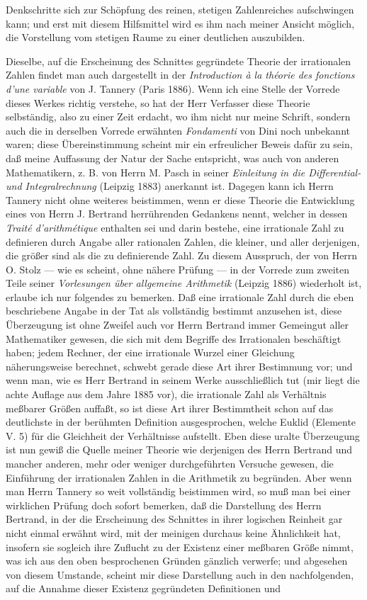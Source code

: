 \documentclass[11pt]{article}
\begin{document}
Denkschritte sich zur Schöpfung des reinen, stetigen Zahlenreiches aufschwingen kann; und erst mit diesem Hilfsmittel wird es ihm nach meiner Ansicht möglich, die Vorstellung vom stetigen Raume zu einer deutlichen auszubilden.

Dieselbe, auf die Erscheinung des Schnittes gegründete Theorie der irrationalen Zahlen findet man auch dargestellt in der \emph{Introduction à la théorie des fonctions d'une variable} von J. Tannery (Paris 1886). Wenn ich eine Stelle der Vorrede dieses Werkes richtig verstehe, so hat der Herr Verfasser diese Theorie selbständig, also zu einer Zeit erdacht, wo ihm nicht nur meine Schrift, sondern auch die in derselben Vorrede erwähnten \emph{Fondamenti} von Dini noch unbekannt waren; diese Übereinstimmung scheint mir ein erfreulicher Beweis dafür zu sein, daß meine Auffassung der Natur der Sache entspricht, was auch von anderen Mathematikern, z. B. von Herrn M. Pasch in seiner \emph{Einleitung in die Differential- und Integralrechnung} (Leipzig 1883) anerkannt ist. Dagegen kann ich Herrn Tannery nicht ohne weiteres beistimmen, wenn er diese Theorie die Entwicklung eines von Herrn J. Bertrand herrührenden Gedankens nennt, welcher in dessen \emph{Traité d'arithmétique} enthalten sei und darin bestehe, eine irrationale Zahl zu definieren durch Angabe aller rationalen Zahlen, die kleiner, und aller derjenigen, die größer sind als die zu definierende Zahl. Zu diesem Ausspruch, der von Herrn O. Stolz — wie es scheint, ohne nähere Prüfung — in der Vorrede zum zweiten Teile seiner \emph{Vorlesungen über allgemeine Arithmetik} (Leipzig 1886) wiederholt ist, erlaube ich nur folgendes zu bemerken. Daß eine irrationale Zahl durch die eben beschriebene Angabe in der Tat als vollständig bestimmt anzusehen ist, diese Überzeugung ist ohne Zweifel auch vor Herrn Bertrand immer Gemeingut aller Mathematiker gewesen, die sich mit dem Begriffe des Irrationalen beschäftigt haben; jedem Rechner, der eine irrationale Wurzel einer Gleichung näherungsweise berechnet, schwebt gerade diese Art ihrer Bestimmung vor; und wenn man, wie es Herr Bertrand in seinem Werke ausschließlich tut (mir liegt die achte Auflage aus dem Jahre 1885 vor), die irrationale Zahl als Verhältnis meßbarer Größen auffaßt, so ist diese Art ihrer Bestimmtheit schon auf das deutlichste in der berühmten Definition ausgesprochen, welche Euklid (Elemente V. 5) für die Gleichheit der Verhältnisse aufstellt. Eben diese uralte Überzeugung ist nun gewiß die Quelle meiner Theorie wie derjenigen des Herrn Bertrand und mancher anderen, mehr oder weniger durchgeführten Versuche gewesen, die Einführung der irrationalen Zahlen in die Arithmetik zu begründen. Aber wenn man Herrn Tannery so weit vollständig beistimmen wird, so muß man bei einer wirklichen Prüfung doch sofort bemerken, daß die Darstellung des Herrn Bertrand, in der die Erscheinung des Schnittes in ihrer logischen Reinheit gar nicht einmal erwähnt wird, mit der meinigen durchaus keine Ähnlichkeit hat, insofern sie sogleich ihre Zuflucht zu der Existenz einer meßbaren Größe nimmt, was ich aus den oben besprochenen Gründen gänzlich verwerfe; und abgesehen von diesem Umstande, scheint mir diese Darstellung auch in den nachfolgenden, auf die Annahme dieser Existenz gegründeten Definitionen und 
\end{document}
